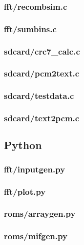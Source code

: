 \documentclass{article}
\begin{document}
	\subsubsection{fft/recombsim.c}
	
	\subsubsection{fft/sumbins.c}
	
	\subsubsection{sdcard/crc7\_calc.c}
	
	\subsubsection{sdcard/pcm2text.c}
	
	\subsubsection{sdcard/testdata.c}
	
	\subsubsection{sdcard/text2pcm.c}
	

\subsection{Python} %
	\subsubsection{fft/inputgen.py}
	
	\subsubsection{fft/plot.py}
	
	\subsubsection{roms/arraygen.py}
	
	\subsubsection{roms/mifgen.py}
	
\end{document}
